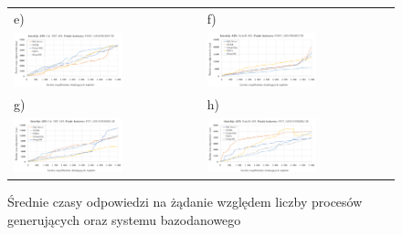 \begin{figure}[H]
\begin{tabular}{@{}ll@{}}
    e) & f) \\
    \includegraphics[width=0.6\textwidth]{rys05/response-dotnet-addProduct.pdf} & \includegraphics[width=0.6\textwidth]{rys05/response-nodejs-addProduct.pdf} \\
    g) & h) \\
    \includegraphics[width=0.6\textwidth]{rys05/response-dotnet-updateCourse.pdf} & \includegraphics[width=0.6\textwidth]{rys05/response-nodejs-updateCourse.pdf} \\
	\end{tabular}
  \caption{Średnie czasy odpowiedzi na żądanie względem liczby procesów generujących oraz systemu bazodanowego}
  \label{fig:response-mtc-1-1}
\end{figure}


\addtocounter{figure}{-1}

